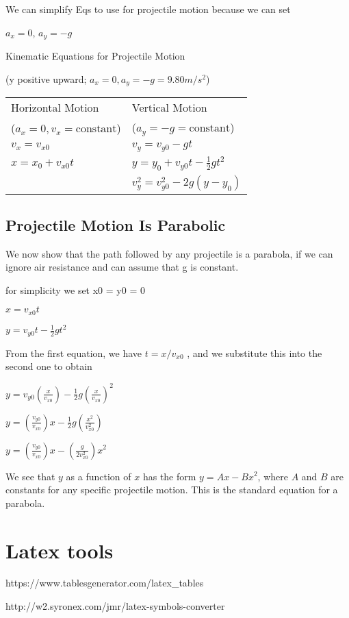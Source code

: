 \documentclass{extarticle}
\begin{document}
\begin{tcolorbox}[enhanced jigsaw,sharp corners,coltext=black,colback=BurntOrange!25!white,boxrule=0pt,breakable,size=minimal]
We can simplify Eqs to use for projectile motion because we can set

$a_x = 0$, $a_y = -g$


Kinematic Equations for Projectile Motion

(y positive upward; $a_x = 0, a_y = -g = 9.80 m/s^2$)




\begin{tabu}{XX}
Horizontal Motion & 
Vertical Motion \\
($a_x = 0, v_x = \text{constant}$) &
($a_y = -g = \text{constant}$) \\
\hline
$v_x = v_{x0}$ &
$v_y = v_{y0} - gt$ \\

$x = x_0 + v_{x0}t $ & 
$y = y_0 + v_{y0}t - \frac{1}{2}gt^2$ \\

 & 
$v_y^2 = v_{y0}^2 - 2g(y - y_0)$ \\ \hline
\end{tabu}







\end{tcolorbox}


\begin{tcolorbox}[enhanced jigsaw,sharp corners,coltext=black,colback=BurntOrange!25!white,boxrule=0pt,breakable,size=minimal]
\subsection{Projectile Motion Is Parabolic}

 We now show that the path followed by any projectile is a parabola, if we can ignore air resistance and can assume that g is constant. 
 
 for simplicity we set x0 = y0 = 0 
 
 
$x = v_{x0}t $

$y = v_{y0}t - \frac{1}{2}gt^2$ 
 
From the first equation, we have $t = x/v_{x0}$ , and we substitute this into the second one to obtain
 
$y = v_{y0}(\frac{x}{v_{x0}}) - \frac{1}{2}g(\frac{x}{v_{x0}})^2$ 

$y = (\frac{v_{y0}}{v_{x0}})x - \frac{1}{2}g(\frac{x^2}{v_{x0}^2})$ 

$y = (\frac{v_{y0}}{v_{x0}})x - (\frac{g}{2v_{x0}^2})x^2$

We see that $y$ as a function of $x$ has the form $y = Ax - Bx^2$, where $A$ and $B$ are constants for any specific projectile motion. This is the standard equation for a parabola.
\end{tcolorbox}


\section{Latex tools}

https://www.tablesgenerator.com/latex\_tables

http://w2.syronex.com/jmr/latex-symbols-converter




\iftoggle{editing}{%
}{%
  \end{multicols}
}
\end{document}
